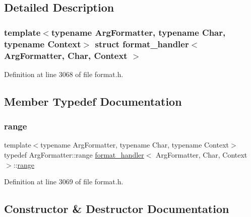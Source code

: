 \subsection{Detailed Description}
\subsubsection*{template$<$typename Arg\+Formatter, typename Char, typename Context$>$\newline
struct format\+\_\+handler$<$ Arg\+Formatter, Char, Context $>$}



Definition at line 3068 of file format.\+h.



\subsection{Member Typedef Documentation}
\mbox{\label{structformat__handler_ac65f0cea520d6e2db8e8738bdbbfa246}} 
\subsubsection{\texorpdfstring{range}{range}}
{\footnotesize\ttfamily template$<$typename Arg\+Formatter, typename Char, typename Context$>$ \\
typedef Arg\+Formatter\+::range \hyperlink{structformat__handler}{format\+\_\+handler}$<$ Arg\+Formatter, Char, Context $>$\+::\hyperlink{structformat__handler_ac65f0cea520d6e2db8e8738bdbbfa246}{range}}



Definition at line 3069 of file format.\+h.



\subsection{Constructor \& Destructor Documentation}
\mbox{\label{structformat__handler_a9bfd742776e1ff31e5ef9801d28fcf78}} 
